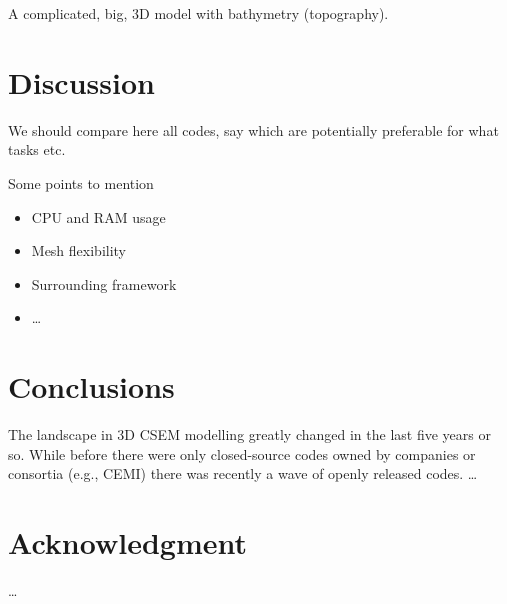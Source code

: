 \documentclass[paper,twocolumn,twoside]{geophysics}
\begin{document}
A complicated, big, 3D model with bathymetry (topography).


\section{Discussion}

We should compare here all codes, say which are potentially preferable for
what tasks etc.

Some points to mention
\begin{itemize}
  \item CPU and RAM usage
  \item Mesh flexibility
  \item Surrounding framework
  \item \dots
\end{itemize}

\section{Conclusions}

The landscape in 3D CSEM modelling greatly changed in the last five years or
so. While before there were only closed-source codes owned by companies or
consortia (e.g., CEMI) there was recently a wave of openly released codes.
\dots

\section{Acknowledgment}
\dots





\end{document}
